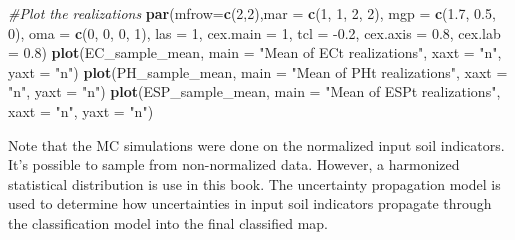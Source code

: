 \documentclass[
  10pt,
  b5paper,
]{book}
\newenvironment{Shaded}{\begin{snugshade}}{\end{snugshade}}
\newcommand{\CommentTok}[1]{\textcolor[rgb]{0.56,0.35,0.01}{\textit{#1}}}
\newcommand{\DataTypeTok}[1]{\textcolor[rgb]{0.13,0.29,0.53}{#1}}
\newcommand{\DecValTok}[1]{\textcolor[rgb]{0.00,0.00,0.81}{#1}}
\newcommand{\FloatTok}[1]{\textcolor[rgb]{0.00,0.00,0.81}{#1}}
\newcommand{\KeywordTok}[1]{\textcolor[rgb]{0.13,0.29,0.53}{\textbf{#1}}}
\newcommand{\NormalTok}[1]{#1}
\newcommand{\StringTok}[1]{\textcolor[rgb]{0.31,0.60,0.02}{#1}}
\begin{document}
\begin{Shaded}
\begin{Highlighting}[]
\CommentTok{#Plot the realizations}
\KeywordTok{par}\NormalTok{(}\DataTypeTok{mfrow=}\KeywordTok{c}\NormalTok{(}\DecValTok{2}\NormalTok{,}\DecValTok{2}\NormalTok{),}\DataTypeTok{mar =} \KeywordTok{c}\NormalTok{(}\DecValTok{1}\NormalTok{, }\DecValTok{1}\NormalTok{, }\DecValTok{2}\NormalTok{, }\DecValTok{2}\NormalTok{), }\DataTypeTok{mgp =} \KeywordTok{c}\NormalTok{(}\FloatTok{1.7}\NormalTok{, }\FloatTok{0.5}\NormalTok{, }\DecValTok{0}\NormalTok{), }\DataTypeTok{oma =} \KeywordTok{c}\NormalTok{(}\DecValTok{0}\NormalTok{, }\DecValTok{0}\NormalTok{, }\DecValTok{0}\NormalTok{, }\DecValTok{1}\NormalTok{),}
\DataTypeTok{las =} \DecValTok{1}\NormalTok{, }\DataTypeTok{cex.main =} \DecValTok{1}\NormalTok{, }\DataTypeTok{tcl =} \FloatTok{-0.2}\NormalTok{, }\DataTypeTok{cex.axis =} \FloatTok{0.8}\NormalTok{, }\DataTypeTok{cex.lab =} \FloatTok{0.8}\NormalTok{)}
\KeywordTok{plot}\NormalTok{(EC_sample_mean, }\DataTypeTok{main =} \StringTok{"Mean of ECt realizations"}\NormalTok{, }\DataTypeTok{xaxt =} \StringTok{"n"}\NormalTok{, }\DataTypeTok{yaxt =} \StringTok{"n"}\NormalTok{)}
\KeywordTok{plot}\NormalTok{(PH_sample_mean, }\DataTypeTok{main =} \StringTok{"Mean of PHt realizations"}\NormalTok{, }\DataTypeTok{xaxt =} \StringTok{"n"}\NormalTok{, }\DataTypeTok{yaxt =} \StringTok{"n"}\NormalTok{)}
\KeywordTok{plot}\NormalTok{(ESP_sample_mean, }\DataTypeTok{main =} \StringTok{"Mean of ESPt realizations"}\NormalTok{, }\DataTypeTok{xaxt =} \StringTok{"n"}\NormalTok{, }\DataTypeTok{yaxt =} \StringTok{"n"}\NormalTok{)}
\end{Highlighting}
\end{Shaded}

Note that the MC simulations were done on the normalized input soil indicators. It's possible to sample
from non-normalized data. However, a harmonized statistical distribution is use in this book.
The uncertainty propagation model is used to determine how uncertainties in input soil indicators
propagate through the classification model into the final classified map.
\end{document}
